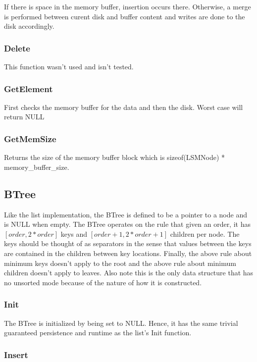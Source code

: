 \documentclass[twocolumn]{article}
\begin{document}
If there is space in the memory buffer, insertion occurs there. Otherwise, a
merge is performed between curent disk and buffer content and writes are done to
the disk accordingly.

\subsubsection{Delete}

This function wasn't used and isn't tested.

\subsubsection{GetElement}

First checks the memory buffer for the data and then the disk. Worst case will
return NULL

\subsubsection{GetMemSize}

Returns the size of the memory buffer block which is sizeof(LSMNode) *
memory\_buffer\_size.

\subsection{BTree}

Like the list implementation, the BTree is defined to be a pointer to a node and
is NULL when empty. The BTree operates on the rule that given an order, it has
$[order, 2 * order]$ keys and $[order + 1, 2 * order + 1]$ children per node.
The keys should be thought of as separators in the sense that values between the
keys are contained in the children between key locations. Finally, the above
rule about minimum keys doesn't apply to the root and the above rule about
minimum children doesn't apply to leaves. Also note this is the only data
structure that has no unsorted mode because of the nature of how it is
constructed.

\subsubsection{Init}

The BTree is initialized by being set to NULL. Hence, it has the same trivial
guaranteed persistence and runtime as the list's Init function.

\subsubsection{Insert}
\end{document}
